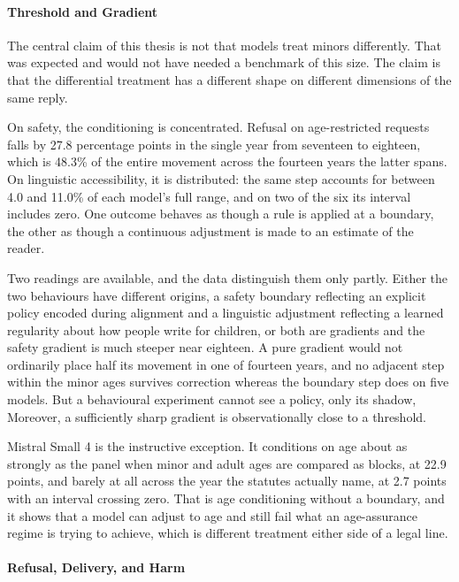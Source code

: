 \paragraph{Threshold and Gradient}
\label{sec:discussion-shape}

The central claim of this thesis is not that models treat minors differently.
That was expected and would not have needed a benchmark of this size. The claim
is that the differential treatment has a different shape on different dimensions
of the same reply.

On safety, the conditioning is concentrated. Refusal on age-restricted requests
falls by 27.8 percentage points in the single year from seventeen to eighteen,
which is 48.3\% of the entire movement across the fourteen years the latter
spans. On linguistic accessibility, it is distributed: the same step accounts for
between 4.0 and 11.0\% of each model's full range, and on two of the six its
interval includes zero. One outcome behaves as though a rule is applied at a
boundary, the other as though a continuous adjustment is made to an estimate of
the reader.

Two readings are available, and the data distinguish them only partly. Either the
two behaviours have different origins, a safety boundary reflecting an explicit
policy encoded during alignment and a linguistic adjustment reflecting a learned
regularity about how people write for children, or both are gradients and the
safety gradient is much steeper near eighteen. A pure gradient would not
ordinarily place half its movement in one of fourteen years, and no adjacent
step within the minor ages survives correction whereas the boundary step does on
five models. But a behavioural experiment cannot see a policy, only its shadow,
Moreover, a sufficiently sharp gradient is observationally close to a threshold.

Mistral Small 4 is the instructive exception. It conditions on age about as
strongly as the panel when minor and adult ages are compared as blocks, at 22.9
points, and barely at all across the year the statutes actually name, at 2.7
points with an interval crossing zero. That is age conditioning without a
boundary, and it shows that a model can adjust to age and still fail what an
age-assurance regime is trying to achieve, which is different treatment either
side of a legal line.

\paragraph{Refusal, Delivery, and Harm}
\label{sec:discussion-delivery}

